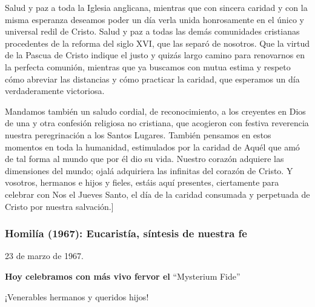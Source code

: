 			\begin{body}\begin{bodysmall}Salud y paz a toda la Iglesia anglicana, mientras que con sincera caridad y con la misma esperanza deseamos poder un día verla unida honrosamente en el único y universal redil de Cristo. Salud y paz a todas las demás comunidades cristianas procedentes de la reforma del siglo XVI, que las separó de nosotros. Que la virtud de la Pascua de Cristo indique el justo y quizás largo camino para renovarnos en la perfecta comunión, mientras que ya buscamos con mutua estima y respeto cómo abreviar las distancias y cómo practicar la caridad, que esperamos un día verdaderamente victoriosa.\end{bodysmall}\end{body}
			
			\begin{body}\begin{bodysmall}Mandamos también un saludo cordial, de reconocimiento, a los creyentes en Dios de una y otra confesión religiosa no cristiana, que acogieron con festiva reverencia nuestra peregrinación a los Santos Lugares. También pensamos en estos momentos en toda la humanidad, estimulados por la caridad de Aquél que amó de tal forma al mundo que por él dio su vida. Nuestro corazón adquiere las dimensiones del mundo; ojalá adquiriera las infinitas del corazón de Cristo. Y vosotros, hermanos e hijos y fieles, estáis aquí presentes, ciertamente para celebrar con Nos el Jueves Santo, el día de la caridad consumada y perpetuada de Cristo por nuestra salvación.]\end{bodysmall}\end{body}
			
			\subsubsection{Homilía (1967): Eucaristía, síntesis de nuestra fe}
			
			\begin{referencia}23 de marzo de 1967. \end{referencia}
			
			\begin{bodycenter}\textbf{Hoy celebramos con más vivo fervor el }“Mysterium Fide”\end{bodycenter}
			
			\begin{body}¡Venerables hermanos y queridos hijos!\end{body}
			
